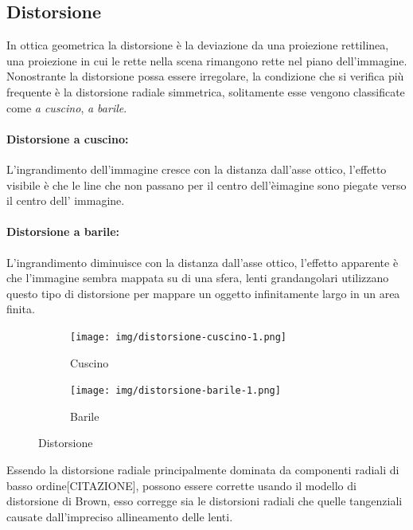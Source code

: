 \subsection{Distorsione}
In ottica geometrica la distorsione è la deviazione da una proiezione rettilinea, una proiezione in cui le rette nella scena rimangono rette nel piano dell'immagine.
Nonostrante la distorsione possa essere irregolare, la condizione che si verifica più frequente è la distorsione radiale simmetrica, solitamente esse vengono classificate come \emph{a cuscino}, \emph{a barile}.

\paragraph{Distorsione a cuscino:}
L'ingrandimento dell'immagine cresce con la distanza dall'asse ottico, l'effetto visibile è che le line che non passano per il centro dell'èimagine sono piegate verso il centro dell' immagine.
\paragraph{Distorsione a barile:}
L'ingrandimento diminuisce con la distanza dall'asse ottico, l'effetto apparente è che l'immagine sembra mappata su di una sfera, lenti grandangolari utilizzano questo tipo di distorsione per mappare un oggetto infinitamente largo in un area finita.
\begin{figure}[!h]
\begin{subfigure}[b]{.5\textwidth}
\centering
\texttt{[image: img/distorsione-cuscino-1.png]}
\caption{Cuscino}\label{fig:distorsione-cuscino}
\end{subfigure}
\begin{subfigure}[b]{.5\textwidth}
\centering
\texttt{[image: img/distorsione-barile-1.png]}
\caption{Barile}\label{fig:distorsione-barile}
\end{subfigure}
\caption{Distorsione}
\label{fig:distorsione}
\end{figure}

Essendo la distorsione radiale principalmente dominata da componenti radiali di basso ordine[CITAZIONE], possono essere corrette usando il modello di distorsione di Brown, esso corregge sia le distorsioni radiali che quelle tangenziali causate dall'impreciso allineamento delle lenti.

